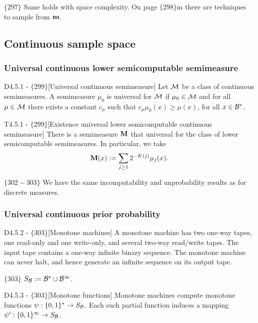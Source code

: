 \documentclass{article}
\begin{document}
$\{297\}$ Same holds with space complexity. On page $\{298\}$m there are techniques to sample from ${\bf m}$.

\subsection{Continuous sample space}

\subsubsection{Universal continuous lower semicomputable semimeasure}

\begin{flexidefinition}{D4.5.1 - $\{299\}$}[Universal continuous semimeasure]
    Let $\mathcal{M}$ be a class of continuous semimeasures. A semimeasure $\mu_0$ is universal for $\mathcal{M}$ if $\mu_0 \in \mathcal{M}$ and for all $\mu \in \mathcal{M}$ there exists a constant $c_\mu$ such that $c_\mu \mu_0(x) \geq \mu(x)$, for all $x \in \mathcal{B}^\ast$.
\end{flexidefinition}
\begin{flexitheorem}{T4.5.1 - $\{299\}$}[Existence universal lower semicomputable continuous semimeasure]
    There is a semimeasure ${\bf M}$ that universal for the class of lower semicomputable semimeasures. In particular, we take
    \begin{equation}
        {\bf M} (x) := \sum_{j\geq 1} 2^{-K(j)}\mu_j(x).
    \end{equation}
\end{flexitheorem}

$\{302-303\}$ We have the same incomputability and unprobability results as for discrete measures.

\subsubsection{Universal continuous prior probability}

\begin{flexidefinition}{D4.5.2 - $\{303\}$}[Monotone machines]
    A monotone machine has two one-way tapes, one read-only and one write-only, and several two-way read/write tapes. The input tape contains a one-way infinite binary sequence. The monotone machine can never halt, and hence generate an infinite sequence on its output tape.
\end{flexidefinition}

$\{303\}$ $S_{\mathcal{B}} := \mathcal{B}^\ast \cup \mathcal{B}^\infty$.

\begin{flexidefinition}{D4.5.3 - $\{303\}$}[Monotone functions]
Monotone machines compute monotone functions $\psi : \{0,1\}^\ast \to S_{\mathcal{B}}$. Each such partial function induces a mapping $\psi' : \{0,1\}^\infty \to S_{\mathcal{B}}$.
\end{flexidefinition}
\end{document}
